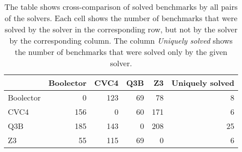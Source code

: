 \begin{table}[tbp]
\centering
\begin{tabular}{lrrrr|r}
  \toprule
 & Boolector & CVC4 & Q3B & Z3 & Uniquely solved \\ 
  \midrule
Boolector &   0 & 123 &  69 &  78 &   8 \\ 
  CVC4 & 156 &   0 &  60 & 171 &   6 \\ 
  Q3B & 185 & 143 &   0 & 208 &  25 \\ 
  Z3 &  55 & 115 &  69 &   0 &   6 \\ 
   \bottomrule
\end{tabular}
\caption{The table shows cross-comparison of solved benchmarks by all pairs of the solvers. Each cell shows the number of benchmarks that were solved by the solver in the corresponding row, but not by the solver by the corresponding column. The column \emph{Uniquely solved} shows the number of benchmarks that were solved only by the given solver.} 
\label{tbl:cross}
\end{table}
